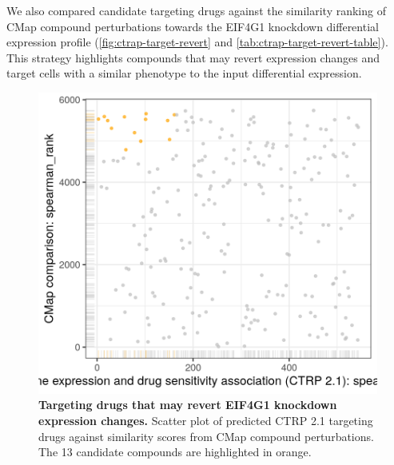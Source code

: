 
We also compared candidate targeting drugs against the similarity ranking of CMap compound perturbations towards the EIF4G1 knockdown differential expression profile (\autoref{fig:ctrap-target-revert} and \autoref{tab:ctrap-target-revert-table}). This strategy highlights compounds that may revert expression changes and target cells with a similar phenotype to the input differential expression. 

\begin{figure}[!h]
	\centering
	\includegraphics[width=.5\textwidth]{images/ctrap/eif4g1-target-revert}
    \caption[Plot of targeting drugs that may revert EIF4G1 knockdown expression changes]{\textbf{Targeting drugs that may revert EIF4G1 knockdown expression changes.} Scatter plot of predicted CTRP 2.1 targeting drugs against similarity scores from CMap compound perturbations. The 13 candidate compounds are highlighted in orange.}
    \label{fig:ctrap-target-revert}
\end{figure}

